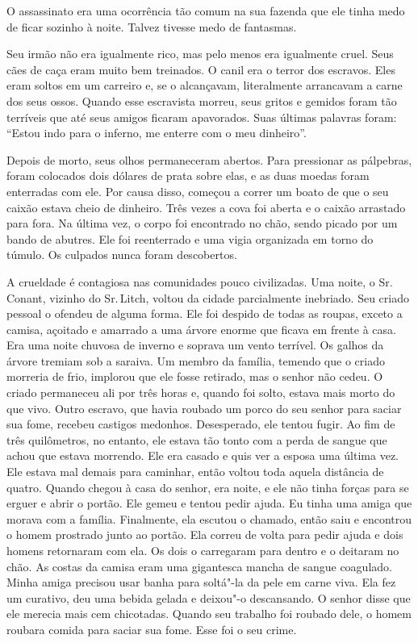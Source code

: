 O assassinato era uma ocorrência tão
comum na sua fazenda que ele tinha medo de ficar sozinho à noite. Talvez
tivesse medo de fantasmas.

Seu irmão não era igualmente rico, mas
pelo menos era igualmente cruel. Seus cães de caça eram muito bem
treinados. O canil era o terror dos escravos. Eles eram soltos em um
carreiro e, se o alcançavam, literalmente arrancavam a carne dos seus
ossos. Quando esse escravista morreu, seus gritos e gemidos foram tão
terríveis que até seus amigos ficaram apavorados. Suas últimas palavras
foram: ``Estou indo para o inferno, me enterre com o meu dinheiro''.

Depois de morto, seus olhos
permaneceram abertos. Para pressionar as pálpebras, foram colocados dois
dólares de prata sobre elas, e as duas moedas foram enterradas com ele.
Por causa disso, começou a correr um boato de que o seu caixão estava
cheio de dinheiro. Três vezes a cova foi aberta e o caixão arrastado
para fora. Na última vez, o corpo foi encontrado no chão, sendo picado
por um bando de abutres. Ele foi reenterrado e uma vigia organizada em
torno do túmulo. Os culpados nunca foram descobertos.

A crueldade é contagiosa nas
comunidades pouco civilizadas. Uma noite, o Sr.\,Conant, vizinho do Sr.\,Litch, voltou da cidade parcialmente inebriado. Seu criado pessoal o
ofendeu de alguma forma. Ele foi despido de todas as roupas, exceto a
camisa, açoitado e amarrado a uma árvore enorme que ficava em frente à
casa. Era uma noite chuvosa de inverno e soprava um vento terrível. Os
galhos da árvore tremiam sob a saraiva. Um membro da família, temendo
que o criado morreria de frio, implorou que ele fosse retirado, mas o
senhor não cedeu. O criado permaneceu ali por três horas e, quando foi
solto, estava mais morto do que vivo. Outro escravo, que havia roubado
um porco do seu senhor para saciar sua fome, recebeu castigos medonhos.
Desesperado, ele tentou fugir. Ao fim de três quilômetros, no entanto,
ele estava tão tonto com a perda de sangue que achou que estava
morrendo. Ele era casado e quis ver a esposa uma última vez. Ele estava
mal demais para caminhar, então voltou toda aquela distância de quatro.
Quando chegou à casa do senhor, era noite, e ele não tinha forças para
se erguer e abrir o portão. Ele gemeu e tentou pedir ajuda. Eu tinha uma
amiga que morava com a família. Finalmente, ela escutou o chamado, então
saiu e encontrou o homem prostrado junto ao portão. Ela correu de volta
para pedir ajuda e dois homens retornaram com ela. Os dois o carregaram
para dentro e o deitaram no chão. As costas da camisa eram uma
gigantesca mancha de sangue coagulado. Minha amiga precisou usar banha
para soltá"-la da pele em carne viva. Ela fez um curativo, deu uma bebida
gelada e deixou"-o descansando. O senhor disse que ele merecia mais cem
chicotadas. Quando seu trabalho foi roubado dele, o homem roubara comida
para saciar sua fome. Esse foi o seu crime.

